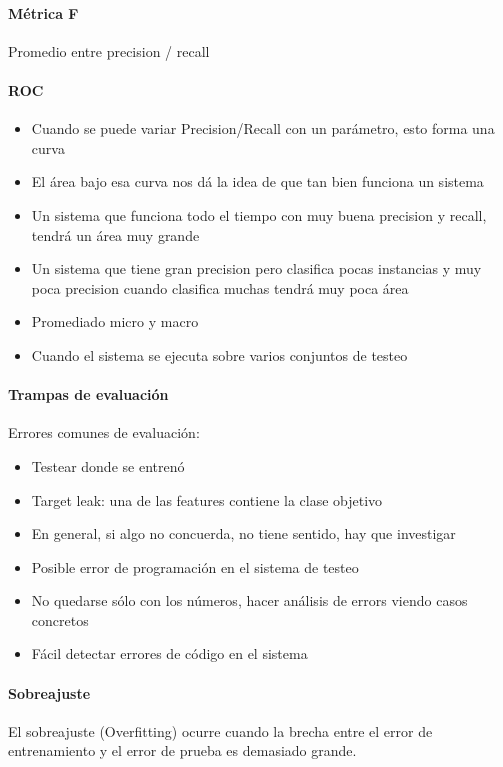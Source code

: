 \documentclass[a4paper,11pt,spanish]{book}
\begin{document}
	\paragraph {Métrica F }
	  Promedio entre precision / recall

	\paragraph {ROC}
	  \begin{itemize}
	    \item Cuando se puede variar Precision/Recall con un parámetro, esto forma una curva
	    \item El área bajo esa curva nos dá la idea de que tan bien funciona un sistema
	    \item Un sistema que funciona todo el tiempo con muy buena precision y recall, tendrá un área muy grande
	    \item Un sistema que tiene gran precision pero clasifica pocas instancias y muy poca precision cuando clasifica muchas tendrá muy poca área
	    \item Promediado micro y macro
	    \item Cuando el sistema se ejecuta sobre varios conjuntos de testeo
	  \end{itemize}

	\paragraph {Trampas de evaluación}
	  Errores comunes de evaluación:
	  \begin{itemize}
	    \item Testear donde se entrenó
	    \item Target leak: una de las features contiene la clase objetivo
	    \item En general, si algo no concuerda, no tiene sentido, hay que investigar
	    \item Posible error de programación en el sistema de testeo
	    \item No quedarse sólo con los números, hacer análisis de errors viendo casos concretos
	    \item Fácil detectar errores de código en el sistema
	  \end{itemize}
	
	\paragraph {Sobreajuste}
	  El sobreajuste (Overfitting) ocurre cuando la brecha entre el error de entrenamiento y el error de prueba es demasiado grande.
\end{document}
